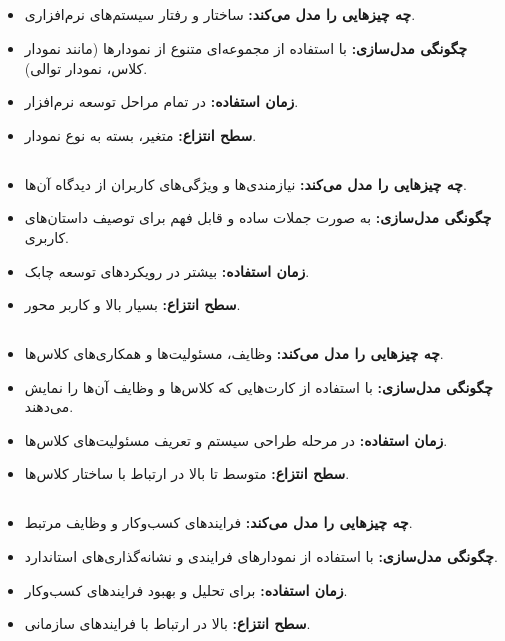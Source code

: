 \subsection*{}
\begin{itemize}
	\item \textbf{چه چیزهایی را مدل می‌کند:} ساختار و رفتار سیستم‌های نرم‌افزاری.
	\item \textbf{چگونگی مدل‌سازی:} با استفاده از مجموعه‌ای متنوع از نمودارها (مانند نمودار کلاس، نمودار توالی).
	\item \textbf{زمان استفاده:} در تمام مراحل توسعه نرم‌افزار.
	\item \textbf{سطح انتزاع:} متغیر، بسته به نوع نمودار.
\end{itemize}

\subsection*{}
\begin{itemize}
	\item \textbf{چه چیزهایی را مدل می‌کند:} نیازمندی‌ها و ویژگی‌های کاربران از دیدگاه آن‌ها.
	\item \textbf{چگونگی مدل‌سازی:} به صورت جملات ساده و قابل فهم برای توصیف داستان‌های کاربری.
	\item \textbf{زمان استفاده:} بیشتر در رویکردهای توسعه چابک.
	\item \textbf{سطح انتزاع:} بسیار بالا و کاربر محور.
\end{itemize}

\subsection*{}
\begin{itemize}
	\item \textbf{چه چیزهایی را مدل می‌کند:} وظایف، مسئولیت‌ها و همکاری‌های کلاس‌ها.
	\item \textbf{چگونگی مدل‌سازی:} با استفاده از کارت‌هایی که کلاس‌ها و وظایف آن‌ها را نمایش می‌دهند.
	\item \textbf{زمان استفاده:} در مرحله طراحی سیستم و تعریف مسئولیت‌های کلاس‌ها.
	\item \textbf{سطح انتزاع:} متوسط تا بالا در ارتباط با ساختار کلاس‌ها.
\end{itemize}

\subsection*{}
\begin{itemize}
	\item \textbf{چه چیزهایی را مدل می‌کند:} فرایندهای کسب‌وکار و وظایف مرتبط.
	\item \textbf{چگونگی مدل‌سازی:} با استفاده از نمودارهای فرایندی و نشانه‌گذاری‌های استاندارد.
	\item \textbf{زمان استفاده:} برای تحلیل و بهبود فرایندهای کسب‌وکار.
	\item \textbf{سطح انتزاع:} بالا در ارتباط با فرایندهای سازمانی.
\end{itemize}


